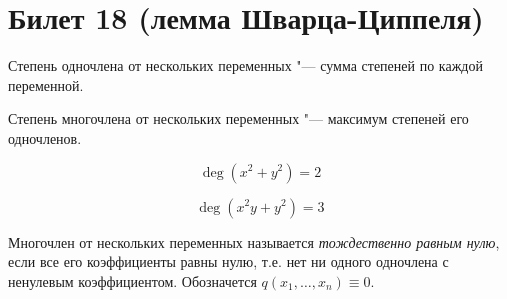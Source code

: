 \setcounter{section}{17}
\section{Билет 18 (лемма Шварца-Циппеля)}
	\begin{Def}
		Степень одночлена от нескольких переменных "--- сумма степеней по каждой переменной.
	\end{Def}
	\begin{Def}
		Степень многочлена от нескольких переменных "--- максимум степеней его одночленов.
	\end{Def}
	\begin{exmp}
		\[ \deg (x^2+y^2) = 2 \]
	\end{exmp}
	\begin{exmp}
		\[ \deg (x^2y + y^2) = 3 \]
	\end{exmp}
	\begin{Def}
		Многочлен от нескольких переменных называется \textit{тождественно равным нулю}, если все его коэффициенты равны нулю, т.е. нет ни одного одночлена с ненулевым коэффициентом.
		Обозначется $q(x_1, \dots, x_n) \equiv 0$.
	\end{Def}

